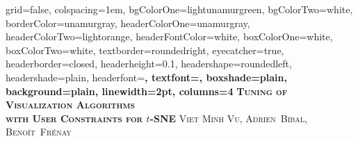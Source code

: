 \documentclass[portrait,final,a0paper]{nadiposter}
\begin{document}







\begin{poster}%
  {
  grid=false,
  colspacing=1em,
  bgColorOne=lightunamurgreen,
  bgColorTwo=white,
  borderColor=unamurgray,
  headerColorOne=unamurgray,
  headerColorTwo=lightorange,
  headerFontColor=white,
  boxColorOne=white,
  boxColorTwo=white,
  textborder=roundedright,
  eyecatcher=true,
  headerborder=closed,
  headerheight=0.1\textheight,
  headershape=roundedleft,
  headershade=plain,
  headerfont=\Large\bf\textsc, %
  textfont={\setlength{\parindent}{1.5em}},
  boxshade=plain,
  background=plain,
  linewidth=2pt,
  columns=4
  }
  {\hbox{} } %
  {\bf\textsc{Tuning of Visualization Algorithms\\ with User Constraints for $t$-SNE}\vspace{0.5em}}
  {\textsc{Viet Minh Vu, Adrien~Bibal,  Beno\^it~Fr\'enay} } %
  {%
   \hbox{} %
  }



\sectionfont{\centering}

\end{poster}
\end{document}
